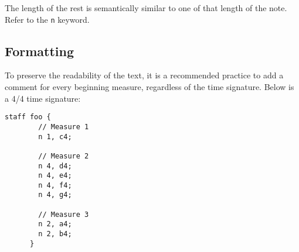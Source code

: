 \np The length of the rest is semantically similar to one of that length
of the note. Refer to the \verb+n+ keyword.

\subsection{Formatting}
\label{formatting}
\np To preserve the readability of the text, it is a recommended practice to add a comment for every
beginning measure, regardless of the time signature. Below is a 4/4 time signature:
\begin{Verbatim}[frame=single]
      staff foo {
        // Measure 1
        n 1, c4;
  
        // Measure 2
        n 4, d4;
        n 4, e4;
        n 4, f4;
        n 4, g4;
  
        // Measure 3
        n 2, a4;
        n 2, b4;
      }
\end{Verbatim}

